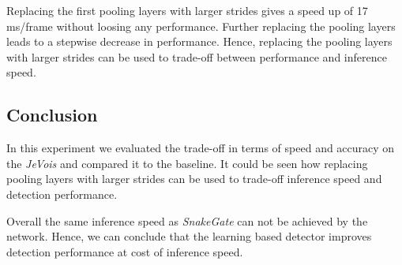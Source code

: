 Replacing the first pooling layers with larger strides gives a speed up of 17 ms/frame without loosing any performance. Further replacing the pooling layers leads to a stepwise decrease in performance. Hence, replacing the pooling layers with larger strides can be used to trade-off between performance and inference speed.

\subsection{Conclusion}

In this experiment we evaluated the trade-off in terms of speed and accuracy on the \textit{JeVois} and compared it to the baseline. It could be seen how replacing pooling layers with larger strides can be used to trade-off inference speed and detection performance. 

Overall the same inference speed as \textit{SnakeGate} can not be achieved by the network. Hence, we can conclude that the learning based detector improves detection performance at cost of inference speed.





